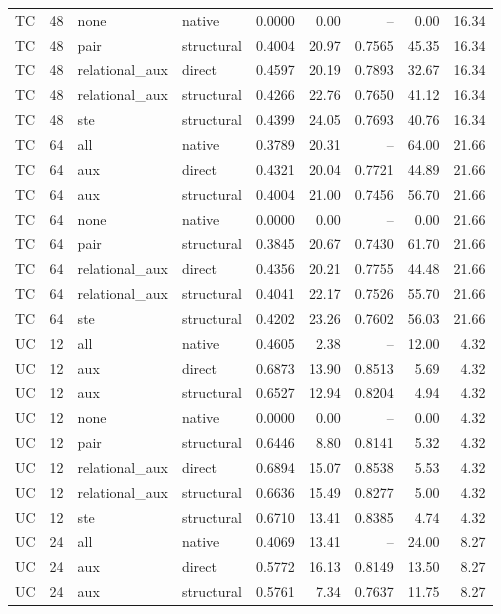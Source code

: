 \begin{longtable}{@{}lrl lrrrrr@{}}
TC & 48 & none & native & 0.0000 & 0.00 & -- & 0.00 & 16.34\\
TC & 48 & pair & structural & 0.4004 & 20.97 & 0.7565 & 45.35 & 16.34\\
TC & 48 & relational\_aux & direct & 0.4597 & 20.19 & 0.7893 & 32.67 & 16.34\\
TC & 48 & relational\_aux & structural & 0.4266 & 22.76 & 0.7650 & 41.12 & 16.34\\
TC & 48 & ste & structural & 0.4399 & 24.05 & 0.7693 & 40.76 & 16.34\\
TC & 64 & all & native & 0.3789 & 20.31 & -- & 64.00 & 21.66\\
TC & 64 & aux & direct & 0.4321 & 20.04 & 0.7721 & 44.89 & 21.66\\
TC & 64 & aux & structural & 0.4004 & 21.00 & 0.7456 & 56.70 & 21.66\\
TC & 64 & none & native & 0.0000 & 0.00 & -- & 0.00 & 21.66\\
TC & 64 & pair & structural & 0.3845 & 20.67 & 0.7430 & 61.70 & 21.66\\
TC & 64 & relational\_aux & direct & 0.4356 & 20.21 & 0.7755 & 44.48 & 21.66\\
TC & 64 & relational\_aux & structural & 0.4041 & 22.17 & 0.7526 & 55.70 & 21.66\\
TC & 64 & ste & structural & 0.4202 & 23.26 & 0.7602 & 56.03 & 21.66\\
UC & 12 & all & native & 0.4605 & 2.38 & -- & 12.00 & 4.32\\
UC & 12 & aux & direct & 0.6873 & 13.90 & 0.8513 & 5.69 & 4.32\\
UC & 12 & aux & structural & 0.6527 & 12.94 & 0.8204 & 4.94 & 4.32\\
UC & 12 & none & native & 0.0000 & 0.00 & -- & 0.00 & 4.32\\
UC & 12 & pair & structural & 0.6446 & 8.80 & 0.8141 & 5.32 & 4.32\\
UC & 12 & relational\_aux & direct & 0.6894 & 15.07 & 0.8538 & 5.53 & 4.32\\
UC & 12 & relational\_aux & structural & 0.6636 & 15.49 & 0.8277 & 5.00 & 4.32\\
UC & 12 & ste & structural & 0.6710 & 13.41 & 0.8385 & 4.74 & 4.32\\
UC & 24 & all & native & 0.4069 & 13.41 & -- & 24.00 & 8.27\\
UC & 24 & aux & direct & 0.5772 & 16.13 & 0.8149 & 13.50 & 8.27\\
UC & 24 & aux & structural & 0.5761 & 7.34 & 0.7637 & 11.75 & 8.27\\

\end{longtable}
